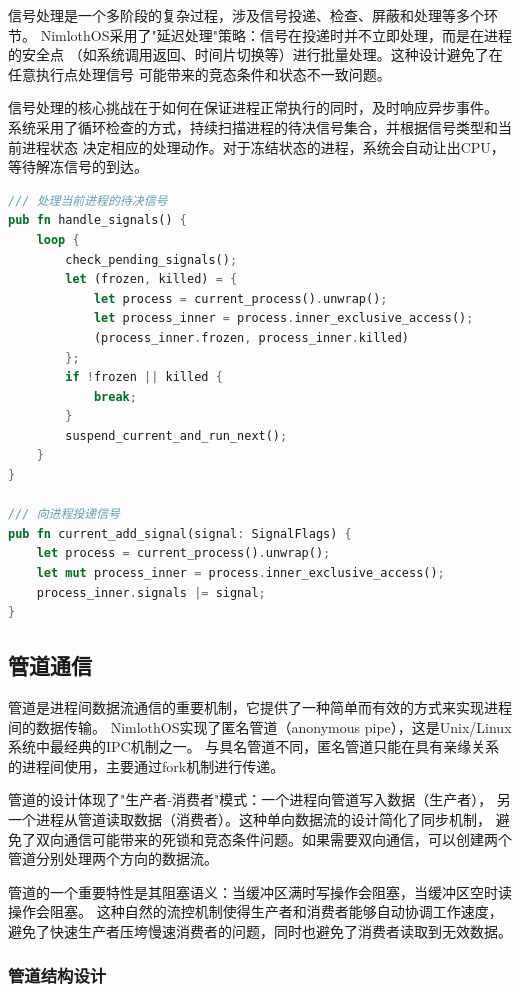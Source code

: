 信号处理是一个多阶段的复杂过程，涉及信号投递、检查、屏蔽和处理等多个环节。
NimlothOS采用了"延迟处理"策略：信号在投递时并不立即处理，而是在进程的安全点
（如系统调用返回、时间片切换等）进行批量处理。这种设计避免了在任意执行点处理信号
可能带来的竞态条件和状态不一致问题。

信号处理的核心挑战在于如何在保证进程正常执行的同时，及时响应异步事件。
系统采用了循环检查的方式，持续扫描进程的待决信号集合，并根据信号类型和当前进程状态
决定相应的处理动作。对于冻结状态的进程，系统会自动让出CPU，等待解冻信号的到达。

\begin{lstlisting}[language=Rust,caption={信号处理实现}, label={lst:signal-handling}]
/// 处理当前进程的待决信号
pub fn handle_signals() {
    loop {
        check_pending_signals();
        let (frozen, killed) = {
            let process = current_process().unwrap();
            let process_inner = process.inner_exclusive_access();
            (process_inner.frozen, process_inner.killed)
        };
        if !frozen || killed {
            break;
        }
        suspend_current_and_run_next();
    }
}

/// 向进程投递信号
pub fn current_add_signal(signal: SignalFlags) {
    let process = current_process().unwrap();
    let mut process_inner = process.inner_exclusive_access();
    process_inner.signals |= signal;
}
\end{lstlisting}

\subsection{管道通信}

管道是进程间数据流通信的重要机制，它提供了一种简单而有效的方式来实现进程间的数据传输。
NimlothOS实现了匿名管道（anonymous pipe），这是Unix/Linux系统中最经典的IPC机制之一。
与具名管道不同，匿名管道只能在具有亲缘关系的进程间使用，主要通过fork机制进行传递。

管道的设计体现了"生产者-消费者"模式：一个进程向管道写入数据（生产者），
另一个进程从管道读取数据（消费者）。这种单向数据流的设计简化了同步机制，
避免了双向通信可能带来的死锁和竞态条件问题。如果需要双向通信，可以创建两个管道分别处理两个方向的数据流。

管道的一个重要特性是其阻塞语义：当缓冲区满时写操作会阻塞，当缓冲区空时读操作会阻塞。
这种自然的流控机制使得生产者和消费者能够自动协调工作速度，
避免了快速生产者压垮慢速消费者的问题，同时也避免了消费者读取到无效数据。

\subsubsection{管道结构设计}

